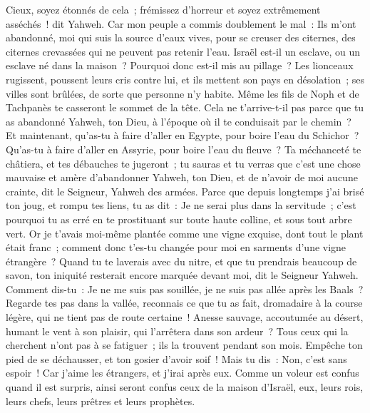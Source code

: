 \begin{multicols}{2}
Cieux, soyez étonnés de cela~; frémissez d'horreur et soyez extrêmement asséchés~! dit Yahweh.
Car mon peuple a commis doublement le mal~: Ils m'ont abandonné, moi qui suis la source d'eaux vives, pour se creuser des citernes, des citernes crevassées qui ne peuvent pas retenir l'eau.
Israël est-il un esclave, ou un esclave né dans la maison~? Pourquoi donc est-il mis au pillage~?
Les lionceaux rugissent, poussent leurs cris contre lui, et ils mettent son pays en désolation~; ses villes sont brûlées, de sorte que personne n'y habite.
Même les fils de Noph et de Tachpanès te casseront le sommet de la tête.
Cela ne t'arrive-t-il pas parce que tu as abandonné Yahweh, ton Dieu, à l'époque où il te conduisait par le chemin~?
Et maintenant, qu'as-tu à faire d'aller en Egypte, pour boire l'eau du Schichor~? Qu'as-tu à faire d'aller en Assyrie, pour boire l'eau du fleuve~?
Ta méchanceté te châtiera, et tes débauches te jugeront~; tu sauras et tu verras que c'est une chose mauvaise et amère d'abandonner Yahweh, ton Dieu, et de n'avoir de moi aucune crainte, dit le Seigneur, Yahweh des armées.
Parce que depuis longtemps j'ai brisé ton joug, et rompu tes liens, tu as dit~: Je ne serai plus dans la servitude~; c'est pourquoi tu as erré en te prostituant sur toute haute colline, et sous tout arbre vert.
Or je t'avais moi-même plantée comme une vigne exquise, dont tout le plant était franc~; comment donc t'es-tu changée pour moi en sarments d'une vigne étrangère~?
Quand tu te laverais avec du nitre, et que tu prendrais beaucoup de savon, ton iniquité resterait encore marquée devant moi, dit le Seigneur Yahweh.
Comment dis-tu~: Je ne me suis pas souillée, je ne suis pas allée après les Baals~? Regarde tes pas dans la vallée, reconnais ce que tu as fait, dromadaire à la course légère, qui ne tient pas de route certaine~!
Anesse sauvage, accoutumée au désert, humant le vent à son plaisir, qui l'arrêtera dans son ardeur~? Tous ceux qui la cherchent n'ont pas à se fatiguer~; ils la trouvent pendant son mois.
Empêche ton pied de se déchausser, et ton gosier d'avoir soif~! Mais tu dis~: Non, c'est sans espoir~! Car j'aime les étrangers, et j'irai après eux.
Comme un voleur est confus quand il est surpris, ainsi seront confus ceux de la maison d'Israël, eux, leurs rois, leurs chefs, leurs prêtres et leurs prophètes.

\end{multicols}
